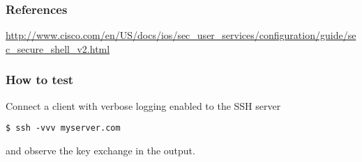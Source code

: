 \subsubsection{References}
\url{http://www.cisco.com/en/US/docs/ios/sec\_user\_services/configuration/guide/sec\_secure\_shell\_v2.html }
\subsubsection{How to test}
Connect a client with verbose logging enabled to the SSH server \\
\begin{lstlisting}[breaklines]
$ ssh -vvv myserver.com
\end{lstlisting}and observe the key exchange in the output.
